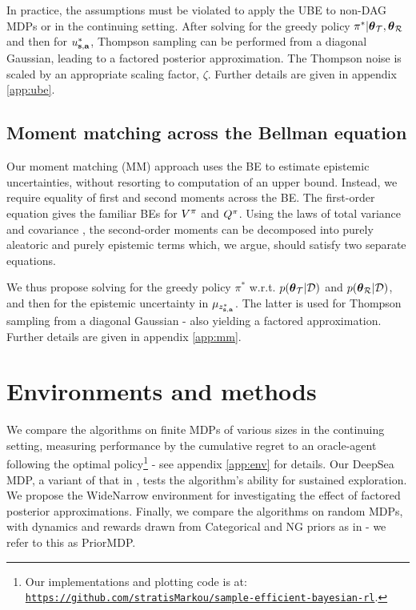 \documentclass{article}
\begin{document}
In practice, the assumptions must be violated to apply the UBE to non-DAG MDPs or in the continuing setting. After solving for the greedy policy ${\pi^*} | \boldsymbol{\theta}_{\mathcal{T}}, \boldsymbol{\theta}_{\mathcal{R}}$ and then for $u_{\mathbf{s}, \mathbf{a}}^{*}$, Thompson sampling can be performed from a diagonal Gaussian, leading to a factored posterior approximation. The Thompson noise is scaled by an appropriate scaling factor, $\zeta$. Further details are given in appendix \ref{app:ube}.

\subsection{Moment matching across the Bellman equation}

Our moment matching (MM) approach uses the BE to estimate epistemic uncertainties, without resorting to computation of an upper bound. Instead, we require equality of first and second moments across the BE. The first-order equation gives the familiar BEs for $V^{\pi}$ and $Q^{\pi}$. Using the laws of total variance and covariance \citep{weiss}, the second-order moments can be decomposed into purely aleatoric and purely epistemic terms which, we argue, should satisfy two separate equations.

We thus propose solving for the greedy policy $\pi^*$ w.r.t. $p(\boldsymbol{\theta}_{\mathcal{T}} | \mathcal{D})$ and $p(\boldsymbol{\theta}_{\mathcal{R}} | \mathcal{D})$, and then for the epistemic uncertainty in $\mu_{z^*_{\mathbf{s}, \mathbf{a}}}$. The latter is used for Thompson sampling from a diagonal Gaussian - also yielding a factored approximation. Further details are given in appendix \ref{app:mm}.

\section{Environments and methods}

We compare the algorithms on finite MDPs of various sizes in the continuing setting, measuring performance by the cumulative regret to an oracle-agent following the optimal policy\footnote{Our implementations and plotting code is at: \scriptsize{\texttt{\href{https://github.com/stratisMarkou/sample-efficient-bayesian-rl}{https://github.com/stratisMarkou/sample-efficient-bayesian-rl}}}.} - see appendix \ref{app:env} for details. Our DeepSea MDP, a variant of that in \cite{deepsea}, tests the algorithm's ability for sustained exploration. We propose the WideNarrow environment for investigating the effect of factored posterior approximations. Finally, we compare the algorithms on random MDPs, with dynamics and rewards drawn from Categorical and NG priors as in \cite{psrl} - we refer to this as PriorMDP.
\end{document}
